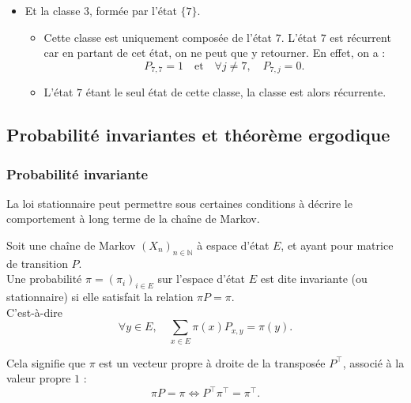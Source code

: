 \documentclass{article}
\begin{document}
\begin{tcolorbox}[colback=white,colframe=yellow!80!black,title=Exemple, breakable]
\begin{itemize}
\begin{itemize}
        \end{itemize}
    \item Et la classe 3, formée par l'état $\{7\}$.
        \begin{itemize}
            \item Cette classe est uniquement composée de l'état $7$. L'état $7$ est récurrent car en partant de cet état, on ne peut que y retourner. En effet, on a :
                \[
                P_{7,7} = 1 \quad \text{et} \quad \forall j \neq 7, \quad P_{7,j} = 0.
                \]
            \item L'état $7$ étant le seul état de cette classe, la classe est alors récurrente.
        \end{itemize}
\end{itemize}
\end{tcolorbox}


\newpage
\subsection{Probabilité invariantes et théorème ergodique}

\subsubsection{Probabilité invariante}

La loi stationnaire peut permettre sous certaines conditions à décrire le comportement à long terme de la chaîne de Markov. \\ %

\begin{tcolorbox}[colback=white,colframe=red!80!black,title=Probabilité invariantes/stationnaire]
Soit une chaîne de Markov $(X_n)_{n \in \mathbb{N}}$ à espace d'état $E$, et ayant pour matrice de transition $P$. \\

Une probabilité $\pi = (\pi_i)_{i \in E}$ sur l'espace d'état $E$ est dite invariante (ou stationnaire) si elle satisfait la relation $\pi P = \pi$. \\

C'est-à-dire
\[
\forall y \in E, \quad \sum_{x \in E} \pi(x) P_{x, y} = \pi(y).
\]
\end{tcolorbox}

Cela signifie que $\pi$ est un vecteur propre à droite de la transposée $P^{\top}$, associé à la valeur propre $1$ :
\[
\pi P = \pi \iff P^{\top} \pi^{\top} = \pi^{\top}.
\]
\end{document}
